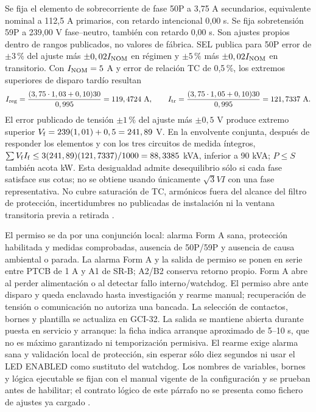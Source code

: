 Se fija el elemento de sobrecorriente de fase 50P a 3,75 A secundarios, equivalente nominal a 112,5 A primarios, con retardo intencional 0,00 s. Se fija sobretensión 59P a 239,00 V fase--neutro, también con retardo 0,00 s. Son ajustes propios dentro de rangos publicados, no valores de fábrica. SEL publica para 50P error de $\pm3\,\%$ del ajuste más $\pm0,02 I_{\rm NOM}$ en régimen y $\pm5\,\%$ más $\pm0,02 I_{\rm NOM}$ en transitorio. Con $I_{\rm NOM}=5$ A y error de relación TC de 0,5\,\%, los extremos superiores de disparo tardío resultan
\[
 I_{\rm reg}=\frac{(3,75\cdot1,03+0,10)30}{0,995}=119,4724~{\rm A},
 \qquad I_{\rm tr}=\frac{(3,75\cdot1,05+0,10)30}{0,995}=121,7337~{\rm A}.
\]
El error publicado de tensión $\pm1\,\%$ del ajuste más $\pm0,5$ V produce extremo superior $V_{\rm f}=239(1,01)+0,5=241,89$ V. En la envolvente conjunta, después de responder los elementos y con los tres circuitos de medida íntegros, $\sum V_{\rm f} I_{\rm f}\le3(241,89)(121,7337)/1000=88,3385$ kVA, inferior a 90 kVA; $P\le S$ también acota kW. Esta desigualdad admite desequilibrio sólo si cada fase satisface sus cotas; no se obtiene usando únicamente $\sqrt3VI$ con una fase representativa. No cubre saturación de TC, armónicos fuera del alcance del filtro de protección, incertidumbres no publicadas de instalación ni la ventana transitoria previa a retirada \parencite[pp.~38--40]{lote29-sel751}.

El permiso se da por una conjunción local: alarma Form A sana, protección habilitada y medidas comprobadas, ausencia de 50P/59P y ausencia de causa ambiental o parada. La alarma Form A y la salida de permiso se ponen en serie entre PTCB de 1 A y A1 de SR-B; A2/B2 conserva retorno propio. Form A abre al perder alimentación o al detectar fallo interno/watchdog. El permiso abre ante disparo y queda enclavado hasta investigación y rearme manual; recuperación de tensión o comunicación no autoriza una bancada. La selección de contactos, bornes y plantilla se actualiza en GCI-32. La salida se mantiene abierta durante puesta en servicio y arranque: la ficha indica arranque aproximado de 5--10 s, que no es máximo garantizado ni temporización permisiva. El rearme exige alarma sana y validación local de protección, sin esperar sólo diez segundos ni usar el LED ENABLED como sustituto del watchdog. Los nombres de variables, bornes y lógica ejecutable se fijan con el manual vigente de la configuración y se prueban antes de habilitar; el contrato lógico de este párrafo no se presenta como fichero de ajustes ya cargado \parencites[pp.~34 y 38]{lote29-sel751}[pp.~1--2]{lote29-selhealth}.

